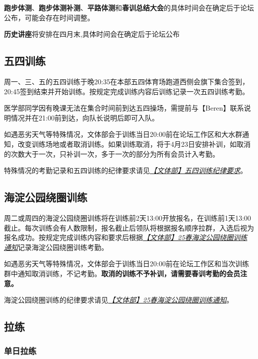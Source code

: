 \documentclass[UTF8]{ctexart}
\begin{document}
\textbf{跑步体测}、\textbf{跑步体测补测}、\textbf{平路体测}和\textbf{春训总结大会}的具体时间会在确定后于论坛公布，可能会存在时间调整。

\textbf{历史讲座}将安排在四月末,具体时间会在确定后于论坛公布

\subsection{五四训练}

周一、三、五的五四训练于晚20:35在本部五四体育场跑道西侧会旗下集合签到，20:45签到结束并开始训练。按规定完成训练内容后训练记录一次五四训练考勤。

医学部同学因有晚课无法在集合时间前到达五四操场，需提前与【Beren】联系说明情况并在21:00前到达，向队长说明后即可入队。

如遇恶劣天气等特殊情况，文体部会于训练当日20:00前在论坛工作区和大水群通知，改变训练场地或者取消训练。如果训练取消，将于4月23日安排补训，如取消的次数大于一次，只补训一次，多于一次的部分为所有会员计入考勤。

特殊情况的考勤记录和五四训练的纪律要求请见\href{https://chexie.net/bbs/content/index.php?bid=1\&tid=9576\&p=1}{\textit{【文体部】五四训练纪律要求}}。


\subsection{海淀公园绕圈训练}

周二或周四的海淀公园绕圈训练将在训练前2天13:00开放报名，在训练前1天13:00截止。每次训练会有人数限制，报名截止后领队将根据报名顺序拉群，入选后视为报名成功。按规定完成训练内容和要求后根据\href{https://www.chexie.net/bbs/content/?bid=1&tid=10124}{\textit{【文体部】25春海淀公园绕圈训练通知}}记录海淀公园绕圈训练考勤。

如遇恶劣天气等特殊情况，文体部会于训练当日20:00前在论坛工作区和当次训练群中通知取消训练，不记考勤。\textbf{取消的训练不予补训，请需要春训考勤的会员注意。}


海淀公园绕圈训练的纪律要求请见\href{https://www.chexie.net/bbs/content/?bid=1&tid=10124}{\textit{【文体部】25春海淀公园绕圈训练通知}}。

\subsection{拉练}

\subsubsection{单日拉练}
\end{document}
